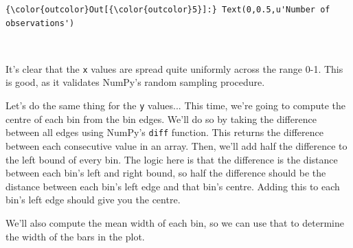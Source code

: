 \documentclass[11pt]{article}
\begin{document}
\begin{Verbatim}[commandchars=\\\{\}]
{\color{outcolor}Out[{\color{outcolor}5}]:} Text(0,0.5,u'Number of observations')
\end{Verbatim}
            
    \begin{center}
    \end{center}
    { \hspace*{\fill} \\}
    
    It's clear that the \texttt{x} values are spread quite uniformly across
the range 0-1. This is good, as it validates NumPy's random sampling
procedure.

Let's do the same thing for the \texttt{y} values... This time, we're
going to compute the centre of each bin from the bin edges. We'll do so
by taking the difference between all edges using NumPy's \texttt{diff}
function. This returns the difference between each consecutive value in
an array. Then, we'll add half the difference to the left bound of every
bin. The logic here is that the difference is the distance between each
bin's left and right bound, so half the difference should be the
distance between each bin's left edge and that bin's centre. Adding this
to each bin's left edge should give you the centre.

We'll also compute the mean width of each bin, so we can use that to
determine the width of the bars in the plot.
\end{document}
